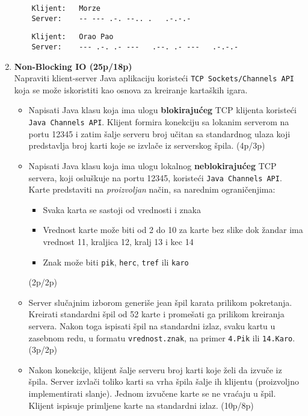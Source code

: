\documentclass[]{article}
\begin{document}
\begin{enumerate}
\vspace{10pt}
\noindent
  \begin{lstlisting}
    Klijent:   Morze
    Server:    -- --- .-. --.. .   .-.-.-
  \end{lstlisting}
  \begin{lstlisting}
    Klijent:   Orao Pao
    Server:    --- .-. .- ---   .--. .- ---   .-.-.-  
  \end{lstlisting}

\vspace{15pt}

\item \textbf{Non-Blocking IO (25p/18p)}
\\Napraviti klient-server Java aplikaciju koriste\'c{}i \texttt{TCP Sockets/Channels API} koja se mo\v{z}e iskoristiti kao osnova za kreiranje karta\v{s}kih igara.
\begin{itemize}
    \item Napisati Java klasu koja ima ulogu \textbf{blokiraju\'c{}eg} TCP klijenta koriste\'c{}i \texttt{Java Channels API}. Klijent formira konekciju sa lokanim serverom na portu 12345 i zatim \v{s}alje serveru broj učitan sa standardnog ulaza koji predstavlja broj karti koje se izvla\v{c}e iz serverskog \v{s}pila. \hfill (4p/3p)
    \item Napisati Java klasu koja ima ulogu lokalnog \textbf{neblokiraju\'c{}eg} TCP servera, koji oslu\v{s}kuje na portu 12345, koriste\'c{}i \texttt{Java Channels API}. Karte predstaviti na \emph{proizvoljan} na\v{c}in, sa narednim ograni\v{c}enjima:
    \begin{itemize}
      \item Svaka karta se sastoji od vrednosti i znaka
      \item Vrednost karte mo\v{z}e biti od 2 do 10 za karte bez slike dok \v{z}andar ima vrednost 11, kraljica 12, kralj 13 i kec 14
      \item Znak mo\v{z}e biti \texttt{pik}, \texttt{herc}, \texttt{tref} ili \texttt{karo}
    \end{itemize} \hfill (2p/2p)
    \item Server slučajnim izborom generiše jean \v{s}pil karata prilikom pokretanja. Kreirati standardni \v{s}pil od 52 karte i prome\v{s}ati ga prilikom kreiranja servera. Nakon toga ispisati \v{s}pil na standardni izlaz, svaku kartu u zasebnom redu, u formatu \texttt{vrednost.znak}, na primer \texttt{4.Pik} ili \texttt{14.Karo}. \hfill (3p/2p)
    \item Nakon konekcije, klijent \v{s}alje serveru broj karti koje \v{z}eli da izvu\v{c}e iz \v{s}pila. Server izvla\v{c}i toliko karti sa vrha \v{s}pila \v{s}alje ih klijentu (proizvoljno implementirati slanje). Jednom izvu\v{c}ene karte se ne vra\'c{}aju u \v{s}pil. Klijent ispisuje primljene karte na standardni izlaz. \hfill (10p/8p)

\end{itemize}
\end{enumerate}
\end{document}
